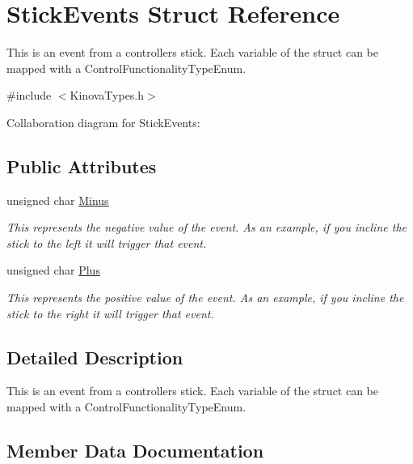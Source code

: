 \hypertarget{struct_stick_events}{}\section{Stick\+Events Struct Reference}
\label{struct_stick_events}


This is an event from a controller\textquotesingle{}s stick. Each variable of the struct can be mapped with a Control\+Functionality\+Type\+Enum.  




{\ttfamily \#include $<$Kinova\+Types.\+h$>$}



Collaboration diagram for Stick\+Events\+:
\subsection*{Public Attributes}
\begin{DoxyCompactItemize}
\item 
unsigned char \hyperlink{struct_stick_events_a73b68205dc2b526373df337d6a4ad532}{Minus}
\begin{DoxyCompactList}\small\item\em This represents the negative value of the event. As an example, if you incline the stick to the left it will trigger that event. \end{DoxyCompactList}\item 
unsigned char \hyperlink{struct_stick_events_ae59f407e1c54c77b4d444fa9c27d5211}{Plus}
\begin{DoxyCompactList}\small\item\em This represents the positive value of the event. As an example, if you incline the stick to the right it will trigger that event. \end{DoxyCompactList}\end{DoxyCompactItemize}


\subsection{Detailed Description}
This is an event from a controller\textquotesingle{}s stick. Each variable of the struct can be mapped with a Control\+Functionality\+Type\+Enum. 

\subsection{Member Data Documentation}
